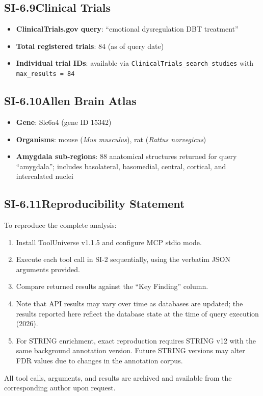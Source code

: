 \subsection*{SI-6.9\quad Clinical Trials}

\begin{itemize}[nosep]
  \item \textbf{ClinicalTrials.gov query}: ``emotional dysregulation DBT
        treatment''
  \item \textbf{Total registered trials}: 84 (as of query date)
  \item \textbf{Individual trial IDs}: available via
        \texttt{ClinicalTrials\_search\_studies} with
        \texttt{max\_results = 84}
\end{itemize}

\subsection*{SI-6.10\quad Allen Brain Atlas}

\begin{itemize}[nosep]
  \item \textbf{Gene}: Slc6a4 (gene ID 15342)
  \item \textbf{Organisms}: mouse (\textit{Mus musculus}), rat
        (\textit{Rattus norvegicus})
  \item \textbf{Amygdala sub-regions}: 88 anatomical structures returned for
        query ``amygdala''; includes basolateral, basomedial, central,
        cortical, and intercalated nuclei
\end{itemize}

\subsection*{SI-6.11\quad Reproducibility Statement}

To reproduce the complete analysis:

\begin{enumerate}[nosep]
  \item Install ToolUniverse v1.1.5 and configure MCP stdio mode.
  \item Execute each tool call in SI-2 sequentially, using the verbatim
        JSON arguments provided.
  \item Compare returned results against the ``Key Finding'' column.
  \item Note that API results may vary over time as databases are updated;
        the results reported here reflect the database state at the time
        of query execution (2026).
  \item For STRING enrichment, exact reproduction requires STRING v12 with
        the same background annotation version.  Future STRING versions may
        alter FDR values due to changes in the annotation corpus.
\end{enumerate}

\noindent
All tool calls, arguments, and results are archived and available from the
corresponding author upon request.